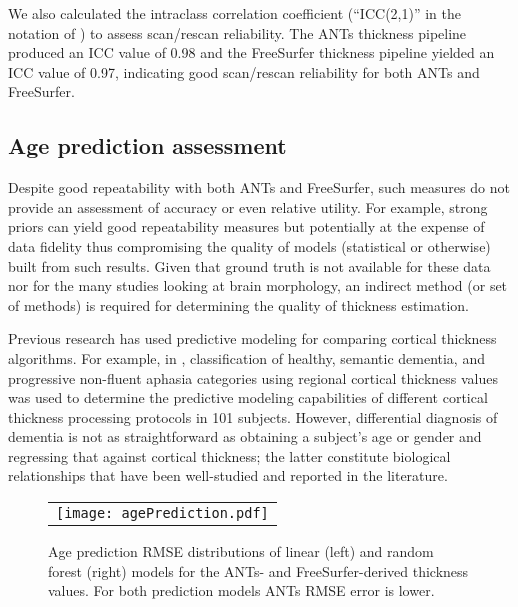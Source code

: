 We also calculated the intraclass correlation coefficient 
(``ICC(2,1)'' in the notation of \cite{shrout1979}) to assess 
scan/rescan reliability. The ANTs thickness pipeline produced an 
ICC value of 0.98 and the FreeSurfer thickness pipeline yielded
an ICC value of 0.97, indicating good scan/rescan reliability for
both ANTs and FreeSurfer.

\subsection{Age prediction assessment}

Despite good repeatability with both ANTs and FreeSurfer, such measures
do not provide an assessment of accuracy or even relative utility.  For example, 
strong priors can yield good repeatability measures but potentially at the expense 
of data fidelity thus compromising the quality of models (statistical or otherwise) 
built from such results.  Given that ground truth is not available for 
these data nor for the many studies looking at brain
morphology, an indirect method (or set of methods) is required for
determining the quality of thickness estimation.

Previous research has used predictive modeling for comparing cortical
thickness algorithms.  For example, in \cite{clarkson2011}, classification
of healthy, semantic dementia, and progressive non-fluent aphasia categories
using regional cortical thickness values was used to determine the predictive
modeling capabilities of different cortical thickness processing protocols in 
101 subjects. However, differential diagnosis of dementia 
\cite{neary2005} is not as straightforward as obtaining a subject's age
or gender and regressing that against cortical thickness; the latter constitute biological
relationships that have been well-studied and reported in the literature.

\begin{figure}[htb]
  \centering
  \begin{tabular}{c}
  \texttt{[image: agePrediction.pdf]} \\
  \end{tabular}
  \caption{Age prediction RMSE distributions of linear (left) and random forest (right)
           models for the ANTs- and FreeSurfer-derived thickness values.  For both prediction
           models ANTs RMSE error is lower.
           }
  \label{fig:agePrediction}
\end{figure}


